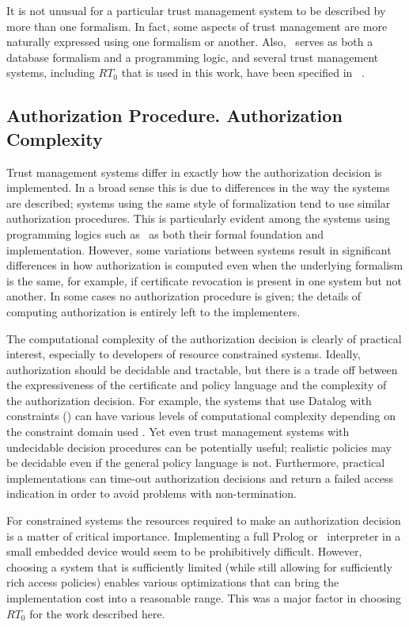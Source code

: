 It is not unusual for a particular trust management system to be described by more than one
formalism. In fact, some aspects of trust management are more naturally expressed using one
formalism or another. Also, \datalog\ serves as both a database formalism and a programming
logic, and several trust management systems, including $RT_0$ that is used in this work, have
been specified in \datalog\ \cite{Li:DCFTML}.

\subsection{Authorization Procedure. Authorization Complexity}

Trust management systems differ in exactly how the authorization decision is implemented. In a
broad sense this is due to differences in the way the systems are described; systems using the
same style of formalization tend to use similar authorization procedures. This is particularly
evident among the systems using programming logics such as \datalog\ as both their formal
foundation and implementation. However, some variations between systems result in significant
differences in how authorization is computed even when the underlying formalism is the same, for
example, if certificate revocation is present in one system but not another. In some cases no
authorization procedure is given; the details of computing authorization is entirely left to the
implementers.

The computational complexity of the authorization decision is clearly of practical interest,
especially to developers of resource constrained systems. Ideally, authorization should be
decidable and tractable, but there is a trade off between the expressiveness of the certificate
and policy language and the complexity of the authorization decision. For example, the systems
that use Datalog with constraints (\datalogc) can have various levels of computational
complexity depending on the constraint domain used \cite{Li:DCFTML}. Yet even trust management
systems with undecidable decision procedures can be potentially useful; realistic policies may
be decidable even if the general policy language is not. Furthermore, practical implementations
can time-out authorization decisions and return a failed access indication in order to avoid
problems with non-termination.

For constrained systems the resources required to make an authorization decision is a matter of
critical importance. Implementing a full Prolog or \datalogc\ interpreter in a small embedded
device would seem to be prohibitively difficult. However, choosing a system that is sufficiently
limited (while still allowing for sufficiently rich access policies) enables various
optimizations that can bring the implementation cost into a reasonable range. This was a major
factor in choosing $RT_0$ for the work described here.

